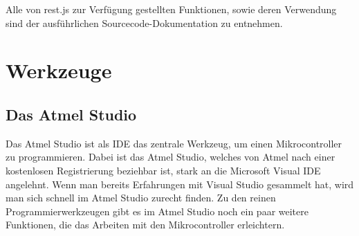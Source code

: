 Alle von \textrm{rest.js} zur Verfügung gestellten Funktionen, sowie deren
Verwendung sind der ausführlichen Sourcecode-Dokumentation zu entnehmen.


\section{Werkzeuge}

\subsection{Das Atmel Studio}

Das Atmel Studio ist als \ac{IDE} das zentrale Werkzeug, um einen Mikrocontroller
zu programmieren. Dabei ist das Atmel Studio, welches von Atmel nach einer
kostenlosen Registrierung beziehbar ist, stark an die Microsoft Visual \ac{IDE}
angelehnt. Wenn man bereits Erfahrungen mit Visual Studio gesammelt hat, wird
man sich schnell im Atmel Studio zurecht finden. Zu den reinen
Programmierwerkzeugen gibt es im Atmel Studio noch ein paar weitere Funktionen,
die das Arbeiten mit den Mikrocontroller erleichtern.


